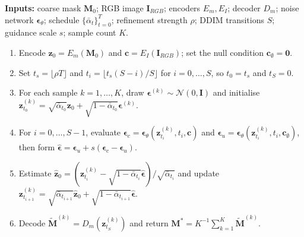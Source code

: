 \documentclass[jimaging,article,submit,pdftex,moreauthors]
  {Definitions/mdpi}
\begin{document}
\begin{table}[htbp]
\caption{Feature-space refinement sampling procedure.}
\label{alg:latent_refinement}
\centering
\begin{minipage}{0.96\textwidth}
\small
\textbf{Inputs:} coarse mask $\mathbf{M}_0$; RGB image $\mathbf{I}_{RGB}$; encoders $E_m,E_I$; decoder $D_m$; noise network $\boldsymbol{\epsilon}_\theta$; schedule $\{\bar{\alpha}_t\}_{t=0}^{T}$; refinement strength $\rho$; DDIM transitions $S$; guidance scale $s$; sample count $K$.\par
\begin{enumerate}[leftmargin=2em,itemsep=2pt,topsep=4pt]
  \item Encode $\mathbf{z}_0=E_m(\mathbf{M}_0)$ and $\mathbf{c}=E_I(\mathbf{I}_{RGB})$; set the null condition $\mathbf{c}_{\emptyset}=\mathbf{0}$.
  \item Set $t_s=\lfloor\rho T\rfloor$ and $t_i=\lfloor t_s(S-i)/S\rfloor$ for $i=0,\ldots,S$, so $t_0=t_s$ and $t_S=0$.
  \item For each sample $k=1,\ldots,K$, draw $\boldsymbol{\epsilon}^{(k)}\sim\mathcal{N}(0,\mathbf{I})$ and initialise $\mathbf{z}^{(k)}_{t_0}=\sqrt{\bar{\alpha}_{t_0}}\mathbf{z}_0+\sqrt{1-\bar{\alpha}_{t_0}}\boldsymbol{\epsilon}^{(k)}$.
  \item For $i=0,\ldots,S-1$, evaluate $\boldsymbol{\epsilon}_{c}=\boldsymbol{\epsilon}_\theta(\mathbf{z}^{(k)}_{t_i},t_i,\mathbf{c})$ and $\boldsymbol{\epsilon}_{u}=\boldsymbol{\epsilon}_\theta(\mathbf{z}^{(k)}_{t_i},t_i,\mathbf{c}_{\emptyset})$, then form $\hat{\boldsymbol{\epsilon}}=\boldsymbol{\epsilon}_{u}+s(\boldsymbol{\epsilon}_{c}-\boldsymbol{\epsilon}_{u})$.
  \item Estimate $\hat{\mathbf{z}}_0=(\mathbf{z}^{(k)}_{t_i}-\sqrt{1-\bar{\alpha}_{t_i}}\hat{\boldsymbol{\epsilon}})/\sqrt{\bar{\alpha}_{t_i}}$ and update $\mathbf{z}^{(k)}_{t_{i+1}}=\sqrt{\bar{\alpha}_{t_{i+1}}}\hat{\mathbf{z}}_0+\sqrt{1-\bar{\alpha}_{t_{i+1}}}\hat{\boldsymbol{\epsilon}}$.
  \item Decode $\tilde{\mathbf{M}}^{(k)}=D_m(\mathbf{z}^{(k)}_{t_S})$ and return $\mathbf{M}^*=K^{-1}\sum_{k=1}^{K}\tilde{\mathbf{M}}^{(k)}$.
\end{enumerate}
\end{minipage}
\end{table}
\end{document}
